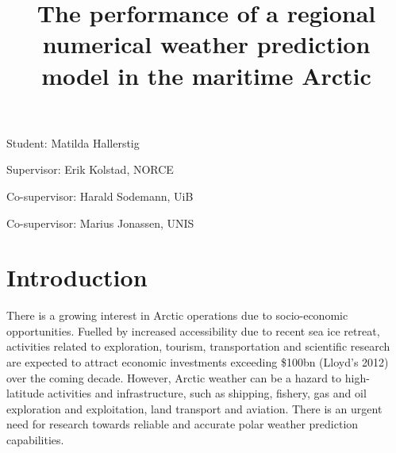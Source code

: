 \documentclass[a4paper,10pt]{article}
\title{The performance of a regional numerical weather prediction model in the maritime Arctic}
\author{}
\begin{document}
\raggedright

\maketitle

Student: Matilda Hallerstig

Supervisor: Erik Kolstad, NORCE 

Co-supervisor: Harald Sodemann, UiB

Co-supervisor: Marius Jonassen, UNIS

\section{Introduction}





There is a growing interest in Arctic operations due to socio-economic opportunities. Fuelled by increased accessibility due to recent sea ice retreat, activities related to exploration, tourism, transportation and scientific research are expected to attract economic investments exceeding \$100bn (Lloyd’s 2012) over the coming decade. However, Arctic weather can be a hazard to high-latitude activities and infrastructure, such as shipping, fishery, gas and oil exploration and exploitation, land transport and aviation. There is an urgent need for research towards reliable and accurate polar weather prediction capabilities. 
\end{document}
